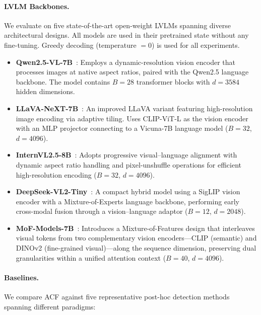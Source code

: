 \documentclass[preprint,12pt]{elsarticle}
\begin{document}
\paragraph{LVLM Backbones.}
We evaluate on five state-of-the-art open-weight LVLMs spanning diverse architectural designs. All models are used in their pretrained state without any fine-tuning. Greedy decoding (temperature $=0$) is used for all experiments.
\begin{itemize}[leftmargin=*]
    \item \textbf{Qwen2.5-VL-7B}~\cite{wu2025qwen}: Employs a dynamic-resolution vision encoder that processes images at native aspect ratios, paired with the Qwen2.5 language backbone. The model contains $B=28$ transformer blocks with $d=3584$ hidden dimensions.
    \item \textbf{LLaVA-NeXT-7B}~\cite{li2024llava}: An improved LLaVA variant featuring high-resolution image encoding via adaptive tiling. Uses CLIP-ViT-L as the vision encoder with an MLP projector connecting to a Vicuna-7B language model ($B=32$, $d=4096$).
    \item \textbf{InternVL2.5-8B}~\cite{chen2024expanding}: Adopts progressive visual--language alignment with dynamic aspect ratio handling and pixel-unshuffle operations for efficient high-resolution encoding ($B=32$, $d=4096$).
    \item \textbf{DeepSeek-VL2-Tiny}~\cite{wu2024deepseek}: A compact hybrid model using a SigLIP vision encoder with a Mixture-of-Experts language backbone, performing early cross-modal fusion through a vision--language adaptor ($B=12$, $d=2048$).
    \item \textbf{MoF-Models-7B}~\cite{tong2024eyes}: Introduces a Mixture-of-Features design that interleaves visual tokens from two complementary vision encoders---CLIP (semantic) and DINOv2 (fine-grained visual)---along the sequence dimension, preserving dual granularities within a unified attention context ($B=40$, $d=4096$).
\end{itemize}

\paragraph{Baselines.}
We compare ACF against five representative post-hoc detection methods spanning different paradigms:
\end{document}
